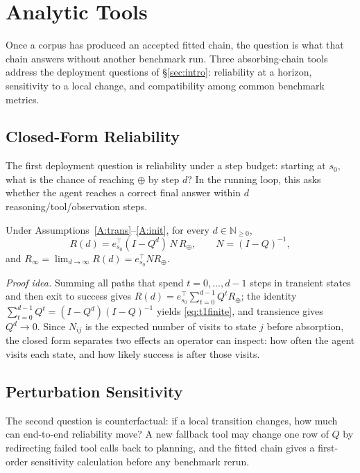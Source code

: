 \section{Analytic Tools}
\label{sec:core}

Once a corpus has produced an accepted fitted chain, the question is
what that chain answers without another benchmark run. Three
absorbing-chain tools address the deployment questions of
\S\ref{sec:intro}: reliability at a horizon, sensitivity to a local
change, and compatibility among common benchmark metrics.

\subsection{Closed-Form Reliability}

The first deployment question is reliability under a step budget:
starting at $s_0$, what is the chance of reaching $\oplus$ by step
$d$? In the running loop, this asks whether the agent reaches a
correct final answer within $d$ reasoning/tool/observation steps.

\begin{proposition}
\label{thm:closed}
Under Assumptions~\ref{A:trans}--\ref{A:init}, for every
$d\in\mathbb{N}_{\ge 0}$,
\begin{equation}
R(d) = e_{s_0}^\top(I-Q^{d})\,N\,R_\oplus,
\qquad N=(I-Q)^{-1},
\label{eq:t1finite}
\end{equation}
and
$R_\infty = \lim_{d\to\infty}R(d) = e_{s_0}^\top N R_\oplus$.
\end{proposition}

\noindent\emph{Proof idea.}
Summing all paths that spend $t=0,\ldots,d-1$ steps in transient states
and then exit to success gives
$R(d)=e_{s_0}^{\top}\sum_{t=0}^{d-1}Q^tR_\oplus$; the identity
$\sum_{t=0}^{d-1}Q^t=(I-Q^d)(I-Q)^{-1}$ yields \eqref{eq:t1finite}, and
transience gives $Q^d\to0$. Since $N_{ij}$ is the expected number of
visits to state $j$ before absorption, the closed form separates two
effects an operator can inspect: how often the agent visits each state,
and how likely success is after those visits.

\subsection{Perturbation Sensitivity}

The second question is counterfactual: if a local transition changes,
how much can end-to-end reliability move? A new fallback tool may
change one row of $Q$ by redirecting failed tool calls back to
planning, and the fitted chain gives a first-order sensitivity
calculation before any benchmark rerun.

